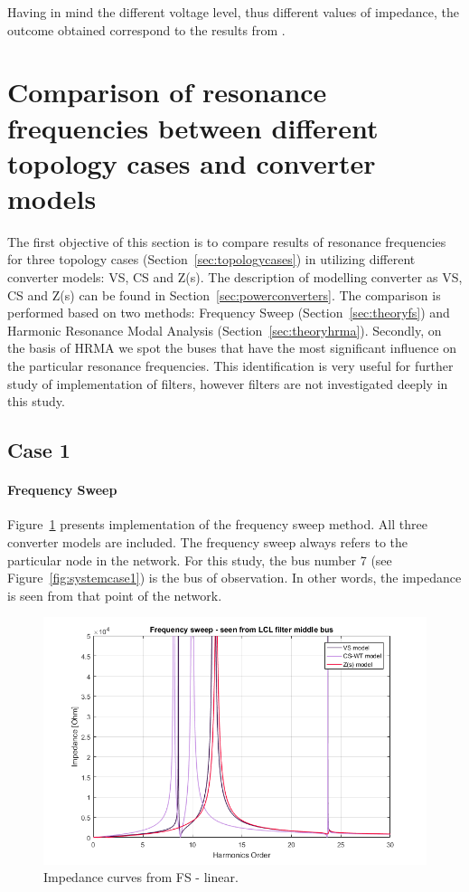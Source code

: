 \documentclass[12pt]{report} %
\begin{document}
Having in mind the different voltage level, thus different values of impedance, the outcome obtained correspond to the results from \cite{liusun2014}.

\section{Comparison of resonance frequencies between different topology cases and converter models} \label{sec:comparison1}
The first objective of this section is to compare results of resonance frequencies for three topology cases (Section~\ref{sec:topologycases}) in utilizing different converter models: VS, CS and Z(s). The description of modelling converter as VS, CS and Z(s) can be found in Section~\ref{sec:powerconverters}. The comparison is performed based on two methods: Frequency Sweep (Section~\ref{sec:theoryfs}) and Harmonic Resonance Modal Analysis (Section~\ref{sec:theoryhrma}). Secondly, on the basis of HRMA we spot the buses that have the most significant influence on the particular resonance frequencies. This identification is very useful for further study of implementation of filters, however filters are not investigated deeply in this study.

\subsection{Case 1}
\paragraph{Frequency Sweep}
Figure~\ref{fig:case1fslin} presents implementation of the frequency sweep method. All three converter models are included. The frequency sweep always refers to the particular node in the network. For this study, the bus number 7 (see Figure~\ref{fig:systemcase1}) is the bus of observation. In other words, the impedance is seen from that point of the network.

\begin{figure}[htb]
	\centering
	\includegraphics[width=1\textwidth]{img/Case1/Case1_FS_lin.png}
  	\caption{Impedance curves from FS - linear.}
  	\label{fig:case1fslin}
\end{figure}
\FloatBarrier
\end{document}
